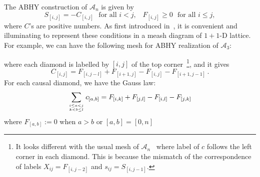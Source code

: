 \documentclass[hidelinks,12pt]{article}
\begin{document}
The ABHY construction of $\mathscr A_n$ is given by 
\[
	S_{[i,j]}=-C_{[i,j]} \,\,\text{ for all $i<j$,}\quad
	F_{[i,j]}\geq 0 \,\,\text{ for all $i\leq j$},
\]
where $C$'s are positive numbers. As first introduced in~\cite{Arkani-Hamed:2019vag}, it is convenient and illuminating to represent these conditions in a meash diagram of $1+1$-D lattice. For example, we can have the following mesh for ABHY realization of $\mathscr A_3$:  
\begin{center}
\end{center}
where each diamond is labelled by $[i,j]$ of the top corner~\footnote{
It looks different with the usual mesh of $\mathscr A_n$~\cite{Arkani-Hamed:2019vag} where label of $c$ follows the left corner
in each diamond. This is because the mismatch of the correspondence of labels 
$X_{ij}=F_{[i,j-2]}$ and $s_{ij}=S_{[i,j-1]}$.
}, and it gives
\begin{equation}\label{CinFA}
	C_{[i,j]}=F_{[i,j-l]}+F_{[i+1,j]}-F_{[i,j]}-F_{[i+1,j-1]}\,.
\end{equation}
For each causal diamond, we have the Gauss law:
\[
	\sum_{i\leq a<j\atop{k<b\leq l}} c_{[a,b]} = 
	F_{[i,k]}+F_{[j,l]}-F_{[i,l]}-F_{[j,k]}
\]
where $F_{[a,b]}:=0$ when $a>b$ or $[a,b]=[0,n]$
\end{document}
